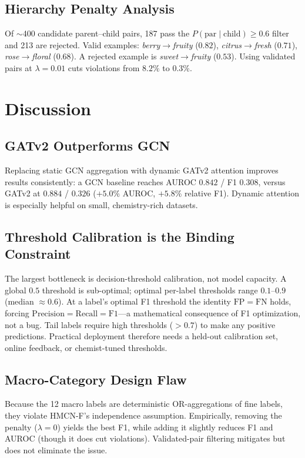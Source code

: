 \documentclass[10pt,twocolumn]{article}
\begin{document}
\subsection{Hierarchy Penalty Analysis}
Of $\sim$400 candidate parent--child pairs, 187 pass the $P(\text{par}\mid\text{child})\ge 0.6$ filter and 213 are rejected. Valid examples: \emph{berry}$\rightarrow$\emph{fruity} ($0.82$), \emph{citrus}$\rightarrow$\emph{fresh} ($0.71$), \emph{rose}$\rightarrow$\emph{floral} ($0.68$). A rejected example is \emph{sweet}$\rightarrow$\emph{fruity} ($0.53$). Using validated pairs at $\lambda=0.01$ cuts violations from $8.2\%$ to $0.3\%$.

\section{Discussion}

\subsection{GATv2 Outperforms GCN}
Replacing static GCN aggregation with dynamic GATv2 attention improves results consistently: a GCN baseline reaches AUROC $0.842$ / F1 $0.308$, versus GATv2 at $0.884$ / $0.326$ ($+5.0\%$ AUROC, $+5.8\%$ relative F1). Dynamic attention is especially helpful on small, chemistry-rich datasets.

\subsection{Threshold Calibration is the Binding Constraint}
The largest bottleneck is decision-threshold calibration, not model capacity. A global $0.5$ threshold is sub-optimal; optimal per-label thresholds range $0.1$--$0.9$ (median $\approx0.6$). At a label's optimal F1 threshold the identity $\mathrm{FP}=\mathrm{FN}$ holds, forcing $\mathrm{Precision}=\mathrm{Recall}=\mathrm{F1}$---a mathematical consequence of F1 optimization, not a bug. Tail labels require high thresholds ($>0.7$) to make any positive predictions. Practical deployment therefore needs a held-out calibration set, online feedback, or chemist-tuned thresholds.

\subsection{Macro-Category Design Flaw}
Because the 12 macro labels are deterministic OR-aggregations of fine labels, they violate HMCN-F's independence assumption. Empirically, removing the penalty ($\lambda=0$) yields the best F1, while adding it slightly reduces F1 and AUROC (though it does cut violations). Validated-pair filtering mitigates but does not eliminate the issue.
\end{document}
